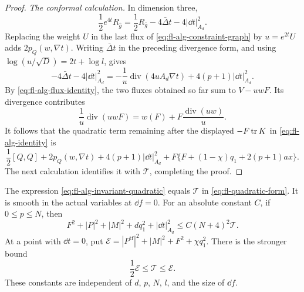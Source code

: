\begin{proof}
\emph{The conformal calculation.}
In dimension three,
\[
 \frac12 e^{4t}R_{\hat g}
 =\frac12R_{\bar g}-4\bar\Delta t-4|\dd t|_{A_d}^2.
\]
Replacing the weight \(U\) in the last flux of
\eqref{eq:fl-alg-constraint-graph} by \(u=e^{2t}U\) adds
\(2p_Q(w,\nabla t)\).
Writing \(\bar\Delta t\) in the preceding divergence form, and using
\(\log(u/\sqrt D)=2t+\log l\), gives
\[
 -4\bar\Delta t-4|\dd t|_{A_d}^2
 =-\frac1u\operatorname{div}(4uA_d\nabla t)
        +4(p+1)|\dd t|_{A_d}^2.
\]
By \eqref{eq:fl-alg-flux-identity}, the two fluxes obtained so far
sum to \(V-uwF\). Its divergence contributes
\[
 \frac1u\operatorname{div}(uwF)
 =w(F)+F\frac{\operatorname{div}(uw)}u.
\]
It follows that the quadratic term remaining after the displayed
\(-F\operatorname{tr} K\) in \eqref{eq:fl-alg-identity} is
\begin{equation}
 \frac12[Q,Q]+2p_Q(w,\nabla t)+4(p+1)|\dd t|_{A_d}^2
       +F\{F+(1-\chi)q_1+2(p+1)ax\}.
 \label{eq:fl-alg-invariant-quadratic}
\end{equation}
The next calculation identifies it with \(\mathcal T\), completing
the proof.
\end{proof}

\begin{lemma}
\label{lem:fl-alg-coercivity}
The expression \eqref{eq:fl-alg-invariant-quadratic} equals
\(\mathcal T\) in \eqref{eq:fl-quadratic-form}. It is smooth in the
actual variables at \(\dd f=0\). For an absolute constant \(C\), if
\(0\le p\le N\), then
\begin{equation}
 F^2+|P|^2+|M|^2+dq_1^2+|\dd t|_{A_d}^2
       \le C(N+4)^2\mathcal T.
 \label{eq:fl-alg-general-coercivity}
\end{equation}
At a point with \(\dd t=0\), put
\(\mathcal E=|P^{\mathrm{tf}}|^2+|M|^2+F^2+\chi q_1^2\).
There is the stronger bound
\begin{equation}
 \frac12\mathcal E\le\mathcal T\le\mathcal E.
 \label{eq:fl-alg-floor-comparison}
\end{equation}
These constants are independent of \(d\), \(p\), \(N\), \(l\), and
the size of \(\dd f\).
\end{lemma}

